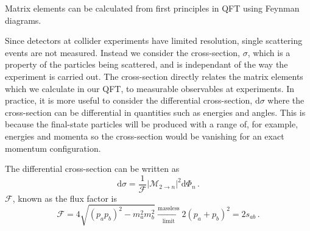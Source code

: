 \documentclass[main.tex]{subfiles}
\begin{document}
    Matrix elements can be calculated from
    first principles in QFT using Feynman diagrams.
    
    Since detectors at collider experiments
    have limited resolution, single scattering
    events are not measured. Instead we consider
    the cross-section, $\sigma$, which is a property
    of the particles being scattered, and is independant
    of the way the experiment is carried out.
    The cross-section directly relates the
    matrix elements which we calculate in our QFT,
    to measurable observables at experiments.
    In practice, it is more useful to consider the
    differential cross-section, $\mathrm{d}\sigma$
    where the cross-section can be differential
    in quantities such as energies and angles.
    This is because the final-state particles
    will be produced with a range of, for example,
    energies and momenta so the cross-section would
    be vanishing for an exact momentum configuration.

    The differential cross-section can be written as
    \begin{equation}\label{eqn:dsigma}
        \mathrm{d}\sigma = \dfrac{1}{\mathcal{F}}|\mathcal{M}_{2 \rightarrow n}|^{2} \mathrm{d}\Phi_{n} \, .
    \end{equation}
    $\mathcal{F}$, known as the flux factor
    is
    \begin{equation}\label{eqn:flux}
        \mathcal{F} = 4\sqrt{(p_{a}p_{b})^{2} - m_{a}^{2}m_{b}^{2}} \xrightarrow[\mathrm{limit}]{\mathrm{massless}} 2(p_{a} + p_{b})^{2} = 2s_{ab} \, .
    \end{equation}
\end{document}
